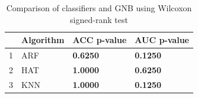 \begin{table}
\footnotesize
\caption{Comparison of classifiers and GNB using Wilcoxon signed-rank test}
\label{tab:wilcoxon comparison}
\begin{tabular}{llll}
\hline
 & Algorithm & ACC p-value & AUC p-value \\
\hline
1 & ARF & \textbf{0.6250} & \textbf{0.1250} \\
2 & HAT & \textbf{1.0000} & \textbf{0.6250} \\
3 & KNN & \textbf{1.0000} & \textbf{0.1250} \\
\hline
\end{tabular}
\end{table}
